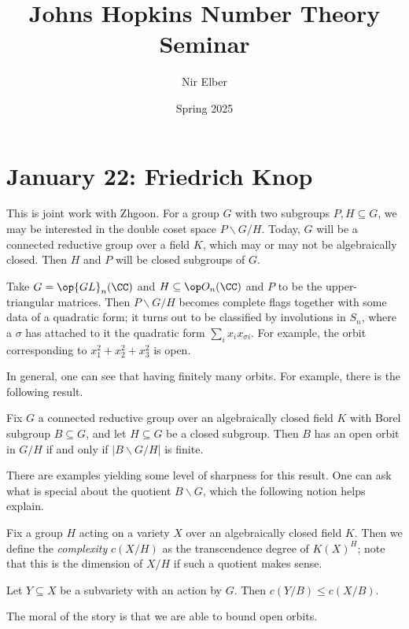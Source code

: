 \documentclass{article}
\title{Johns Hopkins Number Theory Seminar}
\author{Nir Elber}
\date{Spring 2025}
\begin{document}
\maketitle

\tableofcontents

\section{January 22: Friedrich Knop}
This is joint work with Zhgoon. For a group $G$ with two subgroups $P,H\subseteq G$, we may be interested in the double coset space $P\backslash G/H$. Today, $G$ will be a connected reductive group over a field $K$, which may or may not be algebraically closed. Then $H$ and $P$ will be closed subgroups of $G$.
\begin{example}
	Take $G=\op{GL}_n(\CC)$ and $H\subseteq\op O_n(\CC)$ and $P$ to be the upper-triangular matrices. Then $P\backslash G/H$ becomes complete flags together with some data of a quadratic form; it turns out to be classified by involutions in $S_n$, where a $\sigma$ has attached to it the quadratic form $\sum_ix_ix_{\sigma i}$. For example, the orbit corresponding to $x_1^2+x_2^2+x_3^2$ is open.
\end{example}
In general, one can see that having finitely many orbits. For example, there is the following result.
\begin{theorem}
	Fix $G$ a connected reductive group over an algebraically closed field $K$ with Borel subgroup $B\subseteq G$, and let $H\subseteq G$ be a closed subgroup. Then $B$ has an open orbit in $G/H$ if and only if $\left|B\backslash G/H\right|$ is finite.
\end{theorem}
There are examples yielding some level of sharpness for this result. One can ask what is special about the quotient $B\backslash G$, which the following notion helps explain.
\begin{definition}[complexity]
	Fix a group $H$ acting on a variety $X$ over an algebraically closed field $K$. Then we define the \textit{complexity} $c(X/H)$ as the transcendence degree of $K(X)^H$; note that this is the dimension of $X/H$ if such a quotient makes sense.
\end{definition}
\begin{theorem}[Vinburg]
	Let $Y\subseteq X$ be a subvariety with an action by $G$. Then $c(Y/B)\le c(X/B)$.
\end{theorem}
The moral of the story is that we are able to bound open orbits.
\end{document}
